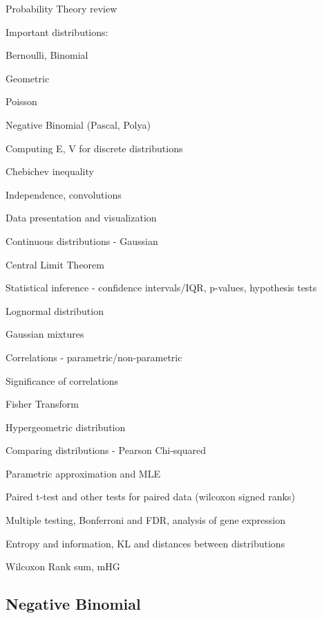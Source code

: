 \documentclass[a4paper]{article}
\newenvironment{itemize*}%
  {\begin{itemize}%
    \setlength{\itemsep}{0pt}%
    \setlength{\parsep}{0pt}%
    \setlength{\parskip}{0pt}}%
  {\end{itemize}}
\begin{document}
\begin{itemize*}
  \item Probability Theory review
  \item Important distributions:
  \begin{itemize*}
    \item Bernoulli, Binomial
    \item Geometric
    \item Poisson
    \item Negative Binomial (Pascal, Polya)
  \end{itemize*}
  \item Computing E, V for discrete distributions
  \item Chebichev inequality
  \item Independence, convolutions
  \item Data presentation and visualization
  \item Continuous distributions - Gaussian
  \item Central Limit Theorem
  \item Statistical inference - confidence intervals/IQR, p-values, hypothesis tests
  \item Lognormal distribution
  \item Gaussian mixtures
  \item Correlations - parametric/non-parametric
  \begin{itemize*}
    \item Significance of correlations
    \item Fisher Transform
  \end{itemize*}
  \item Hypergeometric distribution
  \item Comparing distributions - Pearson Chi-squared
  \item Parametric approximation and MLE
  \item Paired t-test and other tests for paired data (wilcoxon signed ranks)
  \item Multiple testing, Bonferroni and FDR, analysis of gene expression
  \item Entropy and information, KL and distances between distributions
  \item Wilcoxon Rank sum, mHG
\end{itemize*}

\subsection{Negative Binomial}
\end{document}
